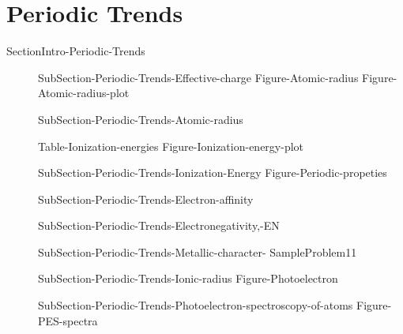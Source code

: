 \documentclass[main.tex]{subfiles}
\newcommand\chapterlabel{Ch-radiation}\setcounter{figurenewcounter}{0}\setcounter{tablenewcounter}{0}\setcounter{formulanewcounter}{0}
\begin{document}
\section{Periodic Trends}{SectionIntro-Periodic-Trends}
\sloppy
\begin{description}
\item[] {SubSection-Periodic-Trends-Effective-charge}
   {Figure-Atomic-radius}
{Figure-Atomic-radius-plot}

\item[] {SubSection-Periodic-Trends-Atomic-radius}

{Table-Ionization-energies}\newpage
{Figure-Ionization-energy-plot}
\item[] {SubSection-Periodic-Trends-Ionization-Energy}
  {Figure-Periodic-propeties}

\item[] {SubSection-Periodic-Trends-Electron-affinity}

 
\item[] {SubSection-Periodic-Trends-Electronegativity,-EN}
\item[]{SubSection-Periodic-Trends-Metallic-character-}
  {SampleProblem11}
\item[]  {SubSection-Periodic-Trends-Ionic-radius}
{Figure-Photoelectron}
\item[] {SubSection-Periodic-Trends-Photoelectron-spectroscopy-of-atoms}
{Figure-PES-spectra}
\end{description}


\newpage
\end{document}
